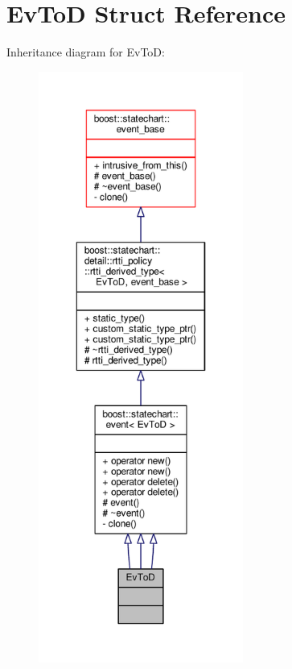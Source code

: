 \hypertarget{struct_ev_to_d}{}\section{Ev\+ToD Struct Reference}
\label{struct_ev_to_d}


Inheritance diagram for Ev\+ToD\+:
\nopagebreak
\begin{figure}[H]
\begin{center}
\leavevmode
\includegraphics[height=550pt]{struct_ev_to_d__inherit__graph}
\end{center}
\end{figure}


